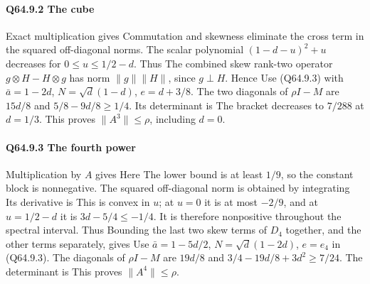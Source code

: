 \paragraph{Q64.9.2 The cube}

Exact multiplication gives
Commutation and skewness eliminate the cross term in the squared
off-diagonal norms. The scalar polynomial
\((1-d-u)^2+u\) decreases for \(0\le u\le1/2-d\). Thus
The combined skew rank-two operator
\(g\otimes H-H\otimes g\) has norm \(\|g\|\|H\|\), since
\(g\perp H\). Hence
Use (Q64.9.3) with \(\bar a=1-2d\), \(N=\sqrt d(1-d)\),
\(e=d+3/8\). The two diagonals of \(\rho I-M\) are
\(15d/8\) and \(5/8-9d/8\ge1/4\). Its determinant is
The bracket decreases to \(7/288\) at \(d=1/3\).
This proves \(\|A^3\|\le\rho\), including \(d=0\).

\paragraph{Q64.9.3 The fourth power}

Multiplication by \(A\) gives
Here
The lower bound is at least \(1/9\), so the constant block is
nonnegative. The squared off-diagonal norm is obtained by integrating
Its derivative is
This is convex in \(u\); at \(u=0\) it is at most \(-2/9\), and
at \(u=1/2-d\) it is \(3d-5/4\le-1/4\).
It is therefore nonpositive throughout the spectral interval. Thus
Bounding the last two skew terms of \(D_4\) together, and the other
terms separately, gives
Use \(\bar a=1-5d/2\), \(N=\sqrt d(1-2d)\), \(e=e_4\) in
(Q64.9.3). The diagonals of \(\rho I-M\) are \(19d/8\) and
\(3/4-19d/8+3d^2\ge7/24\). The determinant is
This proves \(\|A^4\|\le\rho\).

